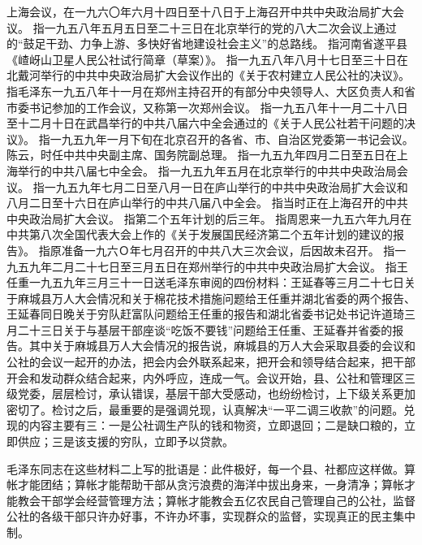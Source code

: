 \begin{maonote}
上海会议，在一九六〇年六月十四日至十八日于上海召开中共中央政治局扩大会议。
指一九五八年五月五日至二十三日在北京举行的党的八大二次会议上通过的“鼓足干劲、力争上游、多快好省地建设社会主义”的总路线。
指河南省遂平县《嵖岈山卫星人民公社试行简章（草案）》。
指一九五八年八月十七日至三十日在北戴河举行的中共中央政治局扩大会议作出的《关于农村建立人民公社的决议》。
指毛泽东一九五八年十一月在郑州主持召开的有部分中央领导人、大区负责人和省市委书记参加的工作会议，又称第一次郑州会议。
指一九五八年十一月二十八日至十二月十日在武昌举行的中共八届六中全会通过的《关于人民公社若干问题的决议》。
指一九五九年一月下旬在北京召开的各省、市、自治区党委第一书记会议。
陈云，时任中共中央副主席、国务院副总理。
指一九五九年四月二日至五日在上海举行的中共八届七中全会。
指一九五九年五月在北京举行的中共中央政治局会议。
指一九五九年七月二日至八月一日在庐山举行的中共中央政治局扩大会议和八月二日至十六日在庐山举行的中共八届八中全会。
指当时正在上海召开的中共中央政治局扩大会议。
指第二个五年计划的后三年。
指周恩来一九五六年九月在中共第八次全国代表大会上作的《关于发展国民经济第二个五年计划的建议的报告》。
指原准备一九六Ｏ年七月召开的中共八大三次会议，后因故未召开。
指一九五九年二月二十七日至三月五日在郑州举行的中共中央政治局扩大会议。
指王任重一九五九年三月三十一日送毛泽东审阅的四份材料：王延春等三月二十七日关于麻城县万人大会情况和关于棉花技术措施问题给王任重并湖北省委的两个报告、王延春同日晚关于穷队赶富队问题给王任重的报告和湖北省委书记处书记许道琦三月二十三日关于与基层干部座谈“吃饭不要钱”问题给王任重、王延春并省委的报告。其中关于麻城县万人大会情况的报告说，麻城县的万人大会采取县委的会议和公社的会议一起开的办法，把会内会外联系起来，把开会和领导结合起来，把干部开会和发动群众结合起来，内外呼应，连成一气。会议开始，县、公社和管理区三级党委，层层检讨，承认错误，基层干部大受感动，也纷纷检讨，上下级关系更加密切了。检讨之后，最重要的是强调兑现，认真解决“一平二调三收款”的问题。兑现的内容主要有三：一是公社调生产队的钱和物资，立即退回；二是缺口粮的，立即供应；三是该支援的穷队，立即予以贷款。

毛泽东同志在这些材料二上写的批语是：此件极好，每一个县、社都应这样做。算帐才能团结；算帐才能帮助干部从贪污浪费的海洋中拔出身来，一身清净；算帐才能教会干部学会经营管理方法；算帐才能教会五亿农民自己管理自己的公社，监督公社的各级干部只许办好事，不许办坏事，实现群众的监督，实现真正的民主集中制。
\end{maonote}
